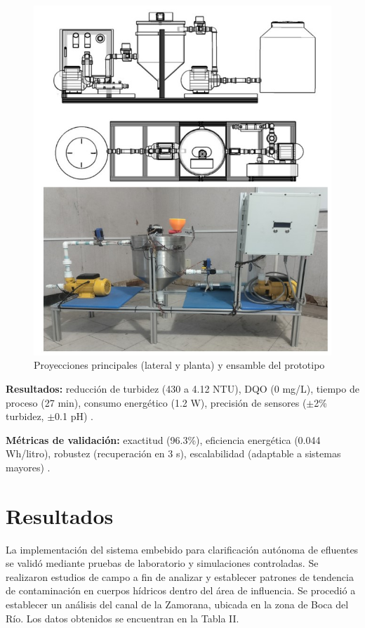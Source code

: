 \documentclass[conference]{IEEEtran}
\begin{document}
\begin{figure}[htbp]
	\centering
	\includegraphics[width=0.8\columnwidth]{fig21.jpg}
	\caption{Proyecciones principales (lateral y planta) y ensamble del prototipo}
	\label{fig:21}
\end{figure}


\textbf{Resultados:} reducción de turbidez (430 a 4.12 NTU), DQO (0 mg/L), tiempo de proceso (27 min), consumo energético (1.2 W), precisión de sensores ($\pm$2\% turbidez, $\pm$0.1 pH) \cite{b39}.

\textbf{Métricas de validación:} exactitud (96.3\%), eficiencia energética (0.044 Wh/litro), robustez (recuperación en 3 s), escalabilidad (adaptable a sistemas mayores) \cite{b40}.

\section{Resultados}

La implementación del sistema embebido para clarificación autónoma de efluentes se validó mediante pruebas de laboratorio y simulaciones controladas. Se realizaron estudios de campo a fin de analizar y establecer patrones de tendencia de contaminación en cuerpos hídricos dentro del área de influencia. Se procedió a establecer un análisis del canal de la Zamorana, ubicada en la zona de Boca del Río. Los datos obtenidos se encuentran en la Tabla II.
\end{document}
